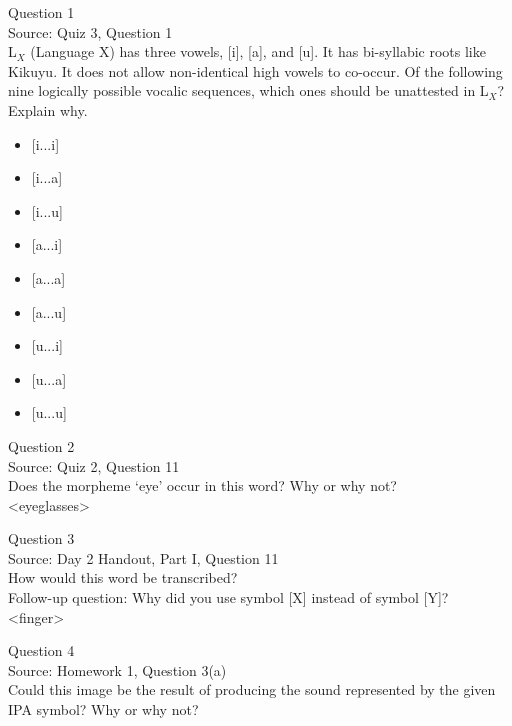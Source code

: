 \documentclass[12pt]{article}
\begin{document}
{\large Question 1}\\

Source: Quiz 3, Question 1\\

L$_X$ (Language X) has three vowels, [i], [a], and [u]. It has bi-syllabic roots like Kikuyu. It does not allow non-identical high vowels to co-occur. Of the following nine logically possible vocalic sequences, which ones should be unattested in L$_X$? Explain why.\\

\begin{itemize} \item {[i...i]} \item {[i...a]} \item {[i...u]} \item {[a...i]} \item {[a...a]} \item {[a...u]} \item {[u...i]} \item {[u...a]} \item {[u...u]} \end{itemize}


\newpage

{\large Question 2}\\

Source: Quiz 2, Question 11\\

Does the morpheme ‘eye’ occur in this word? Why or why not?\\

<eyeglasses>


\newpage

{\large Question 3}\\

Source: Day 2 Handout, Part I, Question 11\\

How would this word be transcribed?\\ Follow-up question: Why did you use symbol [X] instead of symbol [Y]?\\

<finger>


\newpage

{\large Question 4}\\

Source: Homework 1, Question 3(a)\\

Could this image be the result of producing the sound represented by the given IPA symbol? Why or why not?\\
\end{document}
